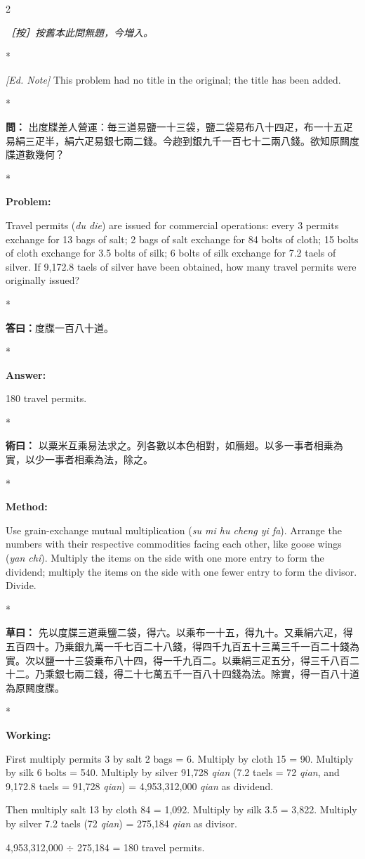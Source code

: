 \documentclass[11pt,a4paper]{article}
\newcommand{\CnQuestion}[1]{\par\noindent\textbf{\color{problemcolor}問：}#1\par\vspace{0.5ex}}
\newcommand{\CnAnswer}[1]{\par\noindent\textbf{\color{answercolor}答曰：}#1\par\vspace{0.5ex}}
\newcommand{\CnMethod}[1]{\par\noindent\textbf{\color{methodcolor}術曰：}#1\par\vspace{0.5ex}}
\newcommand{\CnWorking}[1]{\par\noindent\textbf{草曰：}#1\par\vspace{0.5ex}}
\newcommand{\CnEditorial}[1]{\par\noindent\textcolor{editorialcolor}{\textit{［按］#1}}\par\vspace{0.5ex}}
\newcommand{\EnQuestion}{\par\noindent\textbf{\color{problemcolor}Problem:}\par\vspace{0.5ex}}
\newcommand{\EnAnswer}{\par\noindent\textbf{\color{answercolor}Answer:}\par\vspace{0.5ex}}
\newcommand{\EnMethod}{\par\noindent\textbf{\color{methodcolor}Method:}\par\vspace{0.5ex}}
\newcommand{\EnWorking}{\par\noindent\textbf{Working:}\par\vspace{0.5ex}}
\newcommand{\EnEditorial}{\par\noindent\textcolor{editorialcolor}{\textit{[Ed. Note] }}\ignorespaces}
\newcommand{\switchCn}{\switchcolumn[0]*}
\newcommand{\switchEn}{\switchcolumn[1]*}
\begin{document}
\begin{paracol}{2}

\CnEditorial{按舊本此問無題，今増入。}

\switchEn

\EnEditorial This problem had no title in the original; the title has been added.

\switchCn

\CnQuestion{%
出度牒差人營運：毎三道易鹽一十三袋，鹽二袋易布八十四疋，布一十五疋易絹三疋半，絹六疋易銀七兩二錢。今趂到銀九千一百七十二兩八錢。欲知原闗度牒道數幾何？
}

\switchEn

\EnQuestion
Travel permits (\textit{du die}) are issued for commercial operations: every 3 permits exchange for 13 bags of salt; 2 bags of salt exchange for 84 bolts of cloth; 15 bolts of cloth exchange for 3.5 bolts of silk; 6 bolts of silk exchange for 7.2 taels of silver. If 9,172.8 taels of silver have been obtained, how many travel permits were originally issued?

\switchCn

\CnAnswer{度牒一百八十道。}

\switchEn

\EnAnswer 180 travel permits.

\switchCn

\CnMethod{%
以粟米互乘易法求之。列各數以本色相對，如鴈翅。以多一事者相乗為實，以少一事者相乘為法，除之。
}

\switchEn

\EnMethod
Use grain-exchange mutual multiplication (\textit{su mi hu cheng yi fa}). Arrange the numbers with their respective commodities facing each other, like goose wings (\textit{yan chi}). Multiply the items on the side with one more entry to form the dividend; multiply the items on the side with one fewer entry to form the divisor. Divide.

\switchCn

\CnWorking{%
先以度牒三道乗鹽二袋，得六。以乘布一十五，得九十。又乗絹六疋，得五百四十。乃乗銀九萬一千七百二十八錢，得四千九百五十三萬三千一百二十錢為實。次以鹽一十三袋乗布八十四，得一千九百二。以乗絹三疋五分，得三千八百二十二。乃乘銀七兩二錢，得二十七萬五千一百八十四錢為法。除實，得一百八十道為原闗度牒。
}

\switchEn

\EnWorking
First multiply permits 3 by salt 2 bags = 6. Multiply by cloth 15 = 90. Multiply by silk 6 bolts = 540. Multiply by silver 91,728 \textit{qian} (7.2 taels = 72 \textit{qian}, and 9,172.8 taels = 91,728 \textit{qian}) = 4,953,312,000 \textit{qian} as dividend.

Then multiply salt 13 by cloth 84 = 1,092. Multiply by silk 3.5 = 3,822. Multiply by silver 7.2 taels (72 \textit{qian}) = 275,184 \textit{qian} as divisor.

4,953,312,000 $\div$ 275,184 = 180 travel permits.

\end{paracol}
\end{document}
